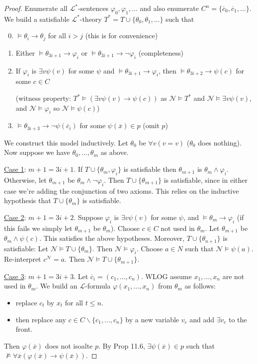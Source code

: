\documentclass[]{article}
\theoremstyle{custhm}
\theoremstyle{cusdef}
\theoremstyle{custhm}
\theoremstyle{custhm}
\theoremstyle{custhm}
\theoremstyle{ex}
\theoremstyle{custhm}
\theoremstyle{cusdef}
\theoremstyle{remark}
\theoremstyle{remark}
\theoremstyle{numremark}
\newcommand{\ra}{\rightarrow}
\renewcommand{\L}{\mathcal{L}}
\renewcommand{\phi}{\varphi}
\renewcommand{\bar}{\overline}
\newcommand{\N}{\mathcal{N}}
\begin{document}
\begin{proof}
Enumerate all $\L^\ast$-sentences $\phi_0,\phi_1,\dots$ and also enumerate $C^n = \{\bar{c}_0,\bar{c}_1,\dots\}$. We build a satisfiable $\L^\ast$-theory $T^\ast = T\cup\{\theta_0,\theta_1,\dots\}$ such that
\begin{enumerate}[label=\arabic*)]
	\setcounter{enumi}{-1}
\item $\models \theta_i\ra\theta_j$ for all $i > j$ (this is for convenience)
\item Either $\models \theta_{3i+1}\ra\phi_i$ or $\models \theta_{3i+1}\ra\neg\phi_i$ (completeness)
\item If $\phi_i$ is $\exists v\psi(v)$ for some $\psi$ and $\models \theta_{3i+1}\ra\phi_i$, then $\models \theta_{3i+2}\ra\psi(c)$ for some $c\in C$

(witness property: $T^\ast \models (\exists v\psi(v)\ra\psi(c))$ as $\N\models T^\ast$ and $\N\models \exists v\psi(v)$, and $\N\models \phi_i$ so $\N\models \psi(c)$)

\item $\models \theta_{3i+3}\ra\neg\psi(\bar{c}_i)$ for some $\psi(\bar{x})\in p$ (omit $p$)
\end{enumerate}

We construct this model inductively. Let $\theta_0$ be $\forall v(v=v)$ ($\theta_0$ does nothing). Now suppose we have $\theta_0,\dots,\theta_m$ as above.

\underline{Case 1}: $m+1 = 3i+1$. If $T\cup\{\theta_m,\phi_i\}$ is satisfiable then $\theta_{m+1}$ is $\theta_m\land\phi_i$. Otherwise, let $\theta_{m+1}$ be $\theta_m\land \neg\phi_i$. Then $T\cup\{\theta_{m+1}\}$ is satisfiable, since in either case we're adding the conjunction of two axioms. This relies on the inductive hypothesis that $T\cup\{\theta_m\}$ is satisfiable.

\underline{Case 2}: $m+1 = 3i+2$. Suppose $\phi_i$ is $\exists v\psi(v)$ for some $\psi$, and $\models \theta_m\ra \phi_i$ (if this fails we simply let $\theta_{m+1}$ be $\theta_m$). Choose $c\in C$ not used in $\theta_m$. Let $\theta_{m+1}$ be $\theta_m\land\psi(c)$. This satisfies the above hypotheses. Moreover, $T\cup\{\theta_{n+1}\}$ is satisfiable: Let $\N\models T\cup\{\theta_m\}$. Then $\N\models \phi_i$. Choose $a\in N$ such that $\N\models \psi(a)$. Re-interpret $c^\N = a$. Then $\N\models T\cup\{\theta_{m+1}\}$.

\underline{Case 3}: $m+1 = 3i+3$. Let $\bar{c}_i = (c_1,\dots,c_n)$. WLOG assume $x_1,\dots,x_n$ are not used in $\theta_m$. We build an $\L$-formula $\phi(x_1,\dots,x_n)$ from $\theta_m$ as follows:
\begin{itemize}
	\item replace $c_t$ by $x_t$ for all $t \le n$.
	\item then replace any $c\in C\backslash\{c_1,\dots,c_n\}$ by a new variable $v_c$ and add $\exists v_c$ to the front.
\end{itemize}
Then $\phi(\bar{x})$ does not isoalte $p$. By Prop 11.6, $\exists \psi(\bar{x})\in p$ such that $\not\models \forall\bar{x}(\phi(\bar{x})\ra\psi(\bar{x}))$.


\end{proof}
\end{document}
